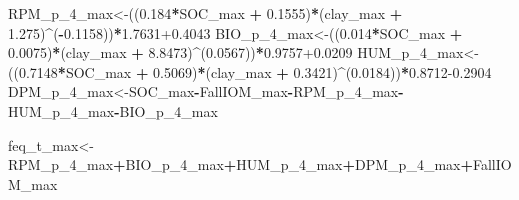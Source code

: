 \documentclass[
  10pt,
  b5paper,
]{book}
\newenvironment{Shaded}{\begin{snugshade}}{\end{snugshade}}
\newcommand{\DecValTok}[1]{\textcolor[rgb]{0.00,0.00,0.81}{#1}}
\newcommand{\FloatTok}[1]{\textcolor[rgb]{0.00,0.00,0.81}{#1}}
\newcommand{\NormalTok}[1]{#1}
\newcommand{\OperatorTok}[1]{\textcolor[rgb]{0.81,0.36,0.00}{\textbf{#1}}}
\newcommand{\StringTok}[1]{\textcolor[rgb]{0.31,0.60,0.02}{#1}}
\begin{document}
\begin{Shaded}
\begin{Highlighting}[]
{\NormalTok{RPM_p_}\DecValTok{4}\NormalTok{_max<-((}\FloatTok{0.184}\OperatorTok{*}\NormalTok{SOC_max }\OperatorTok{+}\StringTok{ }\FloatTok{0.1555}\NormalTok{)}\OperatorTok{*}\NormalTok{(clay_max }\OperatorTok{+}\StringTok{ }\FloatTok{1.275}\NormalTok{)}\OperatorTok{^}\NormalTok{(}\OperatorTok{-}\FloatTok{0.1158}\NormalTok{))}\OperatorTok{*}\FloatTok{1.7631+0.4043}
\NormalTok{BIO_p_}\DecValTok{4}\NormalTok{_max<-((}\FloatTok{0.014}\OperatorTok{*}\NormalTok{SOC_max }\OperatorTok{+}\StringTok{ }\FloatTok{0.0075}\NormalTok{)}\OperatorTok{*}\NormalTok{(clay_max }\OperatorTok{+}\StringTok{ }\FloatTok{8.8473}\NormalTok{)}\OperatorTok{^}\NormalTok{(}\FloatTok{0.0567}\NormalTok{))}\OperatorTok{*}\FloatTok{0.9757+0.0209}
\NormalTok{HUM_p_}\DecValTok{4}\NormalTok{_max<-((}\FloatTok{0.7148}\OperatorTok{*}\NormalTok{SOC_max }\OperatorTok{+}\StringTok{ }\FloatTok{0.5069}\NormalTok{)}\OperatorTok{*}\NormalTok{(clay_max }\OperatorTok{+}\StringTok{ }\FloatTok{0.3421}\NormalTok{)}\OperatorTok{^}\NormalTok{(}\FloatTok{0.0184}\NormalTok{))}\OperatorTok{*}\FloatTok{0.8712-0.2904}
\NormalTok{DPM_p_}\DecValTok{4}\NormalTok{_max<-SOC_max}\OperatorTok{-}\NormalTok{FallIOM_max}\OperatorTok{-}\NormalTok{RPM_p_}\DecValTok{4}\NormalTok{_max}\OperatorTok{-}\NormalTok{HUM_p_}\DecValTok{4}\NormalTok{_max}\OperatorTok{-}\NormalTok{BIO_p_}\DecValTok{4}\NormalTok{_max}

\NormalTok{feq_t_max<-RPM_p_}\DecValTok{4}\NormalTok{_max}\OperatorTok{+}\NormalTok{BIO_p_}\DecValTok{4}\NormalTok{_max}\OperatorTok{+}\NormalTok{HUM_p_}\DecValTok{4}\NormalTok{_max}\OperatorTok{+}\NormalTok{DPM_p_}\DecValTok{4}\NormalTok{_max}\OperatorTok{+}\NormalTok{FallIOM_max}

}
\end{Highlighting}
\end{Shaded}
\end{document}

